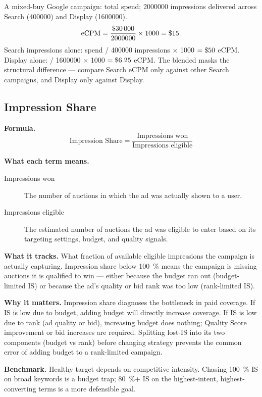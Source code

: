 \begin{example}
A mixed-buy Google campaign:  total spend; \num{2000000} impressions delivered
across Search (\num{400000}) and Display (\num{1600000}).
\[
  \mathrm{eCPM} = \frac{\$\num{30000}}{2000000} \times 1000 = \$\num{15}.
\]
Search impressions alone:  spend / \num{400000} impressions $\times$ 1000
$= \$\num{50}$ eCPM. Display alone:  / \num{1600000} $\times$ 1000
$= \$\num{6.25}$ eCPM. The blended  masks the structural difference --- compare
Search eCPM only against other Search campaigns, and Display only against Display.
\end{example}


\subsection{Impression Share}

\textbf{Formula.}
\[
  \text{Impression Share} = \frac{\text{Impressions won}}{\text{Impressions eligible}}
\]

\textbf{What each term means.}
\begin{description}
  \item[Impressions won] The number of auctions in which the ad was actually shown to a user.
  \item[Impressions eligible] The estimated number of auctions the ad was eligible to enter
    based on its targeting settings, budget, and quality signals.
\end{description}

\textbf{What it tracks.} What fraction of available eligible impressions the campaign is
actually capturing. Impression share below \qty{100}{\percent} means the campaign is missing
auctions it is qualified to win --- either because the budget ran out (budget-limited IS) or
because the ad's quality or bid rank was too low (rank-limited IS).

\textbf{Why it matters.} Impression share diagnoses the bottleneck in paid coverage. If IS
is low due to budget, adding budget will directly increase coverage. If IS is low due to rank
(ad quality or bid), increasing budget does nothing; Quality Score improvement or bid
increases are required. Splitting lost-IS into its two components (budget vs rank) before
changing strategy prevents the common error of adding budget to a rank-limited campaign.

\textbf{Benchmark.} Healthy target depends on competitive intensity. Chasing
\qty{100}{\percent} IS on broad keywords is a budget trap; \qty{80}{\percent}+ IS on
the highest-intent, highest-converting terms is a more defensible goal.

